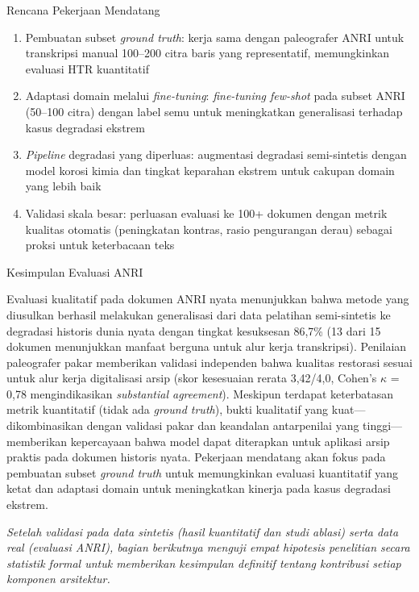 \documentclass[12pt,a4paper]{article}
\begin{document}
Rencana Pekerjaan Mendatang
\begin{enumerate}[nosep]
    \item Pembuatan subset \textit{ground truth}: kerja sama dengan paleografer ANRI untuk transkripsi manual 100--200 citra baris yang representatif, memungkinkan evaluasi HTR kuantitatif
    
    \item Adaptasi domain melalui \textit{fine-tuning}: \textit{fine-tuning few-shot} pada subset ANRI (50--100 citra) dengan label semu untuk meningkatkan generalisasi terhadap kasus degradasi ekstrem
    
    \item \textit{Pipeline} degradasi yang diperluas: augmentasi degradasi semi-sintetis dengan model korosi kimia dan tingkat keparahan ekstrem untuk cakupan domain yang lebih baik
    
    \item Validasi skala besar: perluasan evaluasi ke 100+ dokumen dengan metrik kualitas otomatis (peningkatan kontras, rasio pengurangan derau) sebagai proksi untuk keterbacaan teks
\end{enumerate}

Kesimpulan Evaluasi ANRI

Evaluasi kualitatif pada dokumen ANRI nyata menunjukkan bahwa metode yang diusulkan berhasil melakukan generalisasi dari data pelatihan semi-sintetis ke degradasi historis dunia nyata dengan tingkat kesuksesan 86,7\% (13 dari 15 dokumen menunjukkan manfaat berguna untuk alur kerja transkripsi). Penilaian paleografer pakar memberikan validasi independen bahwa kualitas restorasi sesuai untuk alur kerja digitalisasi arsip (skor kesesuaian rerata 3,42/4,0, Cohen's $\kappa$ = 0,78 mengindikasikan \textit{substantial agreement}). Meskipun terdapat keterbatasan metrik kuantitatif (tidak ada \textit{ground truth}), bukti kualitatif yang kuat---dikombinasikan dengan validasi pakar dan keandalan antarpenilai yang tinggi---memberikan kepercayaan bahwa model dapat diterapkan untuk aplikasi arsip praktis pada dokumen historis nyata. Pekerjaan mendatang akan fokus pada pembuatan subset \textit{ground truth} untuk memungkinkan evaluasi kuantitatif yang ketat dan adaptasi domain untuk meningkatkan kinerja pada kasus degradasi ekstrem.

\vspace{0.5em}

\noindent
\emph{Setelah validasi pada data sintetis (hasil kuantitatif dan studi ablasi) serta data \textit{real} (evaluasi ANRI), bagian berikutnya menguji empat hipotesis penelitian secara statistik formal untuk memberikan kesimpulan definitif tentang kontribusi setiap komponen arsitektur.}
\end{document}
